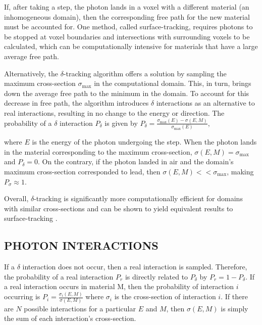 \par If, after taking a step, the photon lands in a voxel with a different material (an inhomogeneous domain), then the corresponding free path for the new material must be accounted for. One method, called surface-tracking, requires photons to be stopped at voxel boundaries and intersections with surrounding voxels to be calculated, which can be computationally intensive for materials that have a large average free path. 
\par Alternatively, the $\delta$-tracking algorithm offers a solution by sampling the maximum cross-section $\sigma_{\text{max}}$ in the computational domain. This, in turn, brings down the average free path to the minimum in the domain. To account for this decrease in free path, the algorithm introduces $\delta$ interactions as an alternative to real interactions, resulting in no change to the energy or direction. The probability of a $\delta$ interaction $P_{\delta}$ is given by 
    $
    P_{\delta} = \frac{\sigma_{\text{max}}(E) - \sigma(E, M)}{\sigma_{\text{max}}(E)},
    $

where $E$ is the energy of the photon undergoing the step. When the photon lands in the material corresponding to the maximum cross-section, $\sigma(E, M) = \sigma_{\text{max}}$ and $P_{\delta} = 0$. On the contrary, if the photon landed in air and the domain's maximum cross-section corresponded to lead, then $\sigma(E, M) << \sigma_{\text{max}}$, making $P_{\sigma} \approx 1$.

\par Overall, $\delta$-tracking is significantly more computationally efficient for domains with similar cross-sections and can be shown to yield equivalent results to surface-tracking \cite{vassiliev_monte_2017}.

\subsection{PHOTON INTERACTIONS}
If a $\delta$ interaction does not occur, then a real interaction is sampled. Therefore, the probability of a real interaction $P_r$ is directly related to $P_\delta$ by
    $
    P_r = 1 - P_\delta.
    $ If a real interaction occurs in material M, then the probability of interaction $i$ occurring is $P_i = \frac{\sigma_i(E, M)}{\sigma (E, M)}$ where $\sigma_i$ is the cross-section of interaction $i$. If there are $N$ possible interactions for a particular $E$ and $M$, then $\sigma (E, M)$ is simply the sum of each interaction's cross-section.

